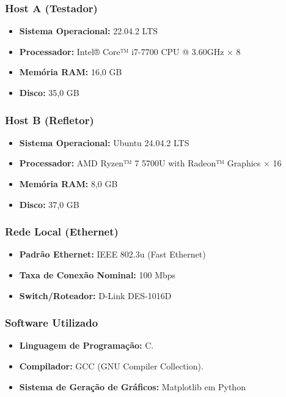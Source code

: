 \subsubsection{Host A (Testador)}
\begin{itemize}
    \item \textbf{Sistema Operacional:} 22.04.2 LTS
    \item \textbf{Processador:} Intel® Core™ i7-7700 CPU @ 3.60GHz × 8
    \item \textbf{Memória RAM:} 16,0 GB
    \item \textbf{Disco:} 35,0 GB
\end{itemize}

\subsubsection{Host B (Refletor)}
\begin{itemize}
    \item \textbf{Sistema Operacional:} Ubuntu 24.04.2 LTS
    \item \textbf{Processador:} AMD Ryzen™ 7 5700U with Radeon™ Graphics × 16
    \item \textbf{Memória RAM:} 8,0 GB
    \item \textbf{Disco:} 37,0 GB
\end{itemize}

\subsubsection{Rede Local (Ethernet)}
\begin{itemize}
    \item \textbf{Padrão Ethernet:} IEEE 802.3u (Fast Ethernet)
    \item \textbf{Taxa de Conexão Nominal:} 100 Mbps
    \item \textbf{Switch/Roteador:} D-Link DES-1016D
\end{itemize}

\subsubsection{Software Utilizado}
\begin{itemize}
    \item \textbf{Linguagem de Programação:} C.
    \item \textbf{Compilador:} GCC (GNU Compiler Collection).
    \item \textbf{Sistema de Geração de Gráficos:} Matplotlib em Python
\end{itemize}

